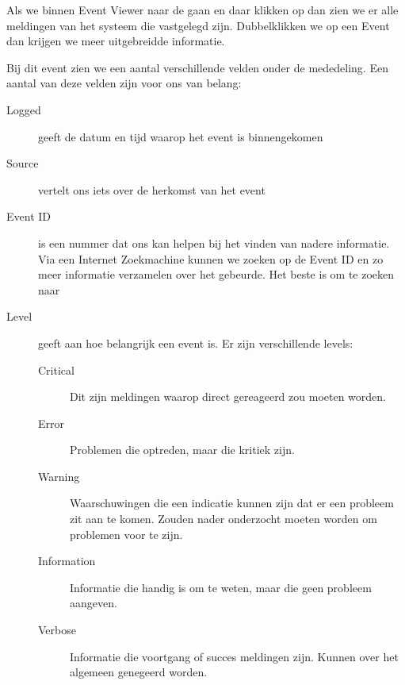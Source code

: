 Als we binnen Event Viewer naar de  gaan en daar klikken op  dan zien we er alle meldingen van het systeem die vastgelegd zijn. Dubbelklikken we op een Event dan krijgen we meer uitgebreidde informatie.

\begin{minipage}[t]{\linewidth}
\raggedright
{}
\end{minipage}

Bij dit event zien we een aantal verschillende velden onder de mededeling. Een aantal van deze velden zijn voor ons van belang:
\begin{description}
\item[Logged] geeft de datum en tijd waarop het event is binnengekomen
\item[Source] vertelt ons iets over de herkomst van het event
\item[Event ID] is een nummer dat ons kan helpen bij het vinden van nadere informatie. Via een Internet Zoekmachine kunnen we zoeken op de Event ID en zo meer informatie verzamelen over het gebeurde. Het beste is om te zoeken naar 
\item[Level] geeft aan hoe belangrijk een event is. Er zijn verschillende levels:
	\begin{description}
	\item[Critical] Dit zijn meldingen waarop direct gereageerd zou moeten worden.
	\item[Error] Problemen die optreden, maar die kritiek zijn.
	\item[Warning] Waarschuwingen die een indicatie kunnen zijn dat er een probleem zit aan te komen. Zouden nader onderzocht moeten worden om problemen voor te zijn.
	\item[Information] Informatie die handig is om te weten, maar die geen probleem aangeven.
	\item[Verbose] Informatie die voortgang of succes meldingen zijn. Kunnen over het algemeen genegeerd worden.
	\end{description}
\end{description}


